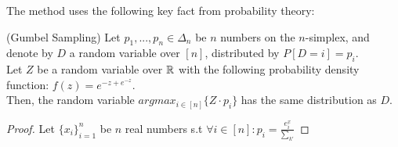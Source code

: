The method uses the following key fact from probability theory:
\begin{thm}
(Gumbel Sampling) Let $p_1,...,p_n \in \Delta_n$ be $n$ numbers on the $n$-simplex, and denote by $D$ a random variable over $[n]$, distributed by $P[D=i]=p_i$.\\
Let $Z$ be a random variable over $\mathbb{R}$ with the following probability density function: $f(z) = e^{-z+e^{-z}}$.\\
Then, the random variable $argmax_{i\in[n]}\{Z\cdot p_i\}$ has the same distribution as $D$.
\end{thm}
\begin{proof} 
Let $\{x_i\}_{i=1}^{n}$ be $n$ real numbers s.t $\forall i\in[n]: p_{i} = \frac{e^x_i}{\sum_{k'}}$
\end{proof}
